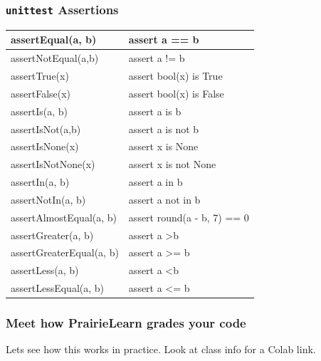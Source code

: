 \documentclass{beamer}
\begin{document}
%
%
\begin{frame}[fragile]
    \frametitle{\lstinline|unittest| Assertions}
    \begin{table}[]
        \small
        \begin{tabular}{l|l}
            \hline
            assertEqual(a, b)        & assert a == b               \\ \hline
            assertNotEqual(a,b)      & assert a != b               \\ \hline
            assertTrue(x)            & assert bool(x) is True      \\ \hline
            assertFalse(x)           & assert bool(x) is False     \\ \hline
            assertIs(a, b)           & assert a is b               \\ \hline
            assertIsNot(a,b)         & assert a is not b           \\ \hline
            assertIsNone(x)          & assert x is None            \\ \hline
            assertIsNotNone(x)       & assert x is not None        \\ \hline
            assertIn(a, b)           & assert a in b               \\ \hline
            assertNotIn(a, b)        & assert a not in b           \\ \hline
            assertAlmostEqual(a, b)  & assert round(a - b, 7) == 0 \\ \hline
            assertGreater(a, b)      & assert a \textgreater b     \\ \hline
            assertGreaterEqual(a, b) & assert a \textgreater{}= b  \\ \hline
            assertLess(a, b)         & assert a \textless b        \\ \hline
            assertLessEqual(a, b)    & assert a \textless{}= b     \\ \hline
        \end{tabular}
    \end{table}
\end{frame}

%
%
\begin{frame}[fragile]
    \frametitle{Meet how PrairieLearn grades your code}
    \centering
    \vfill
    Lets see how this works in practice. Look at class info for a Colab link.
    \vfill
\end{frame}
\end{document}
